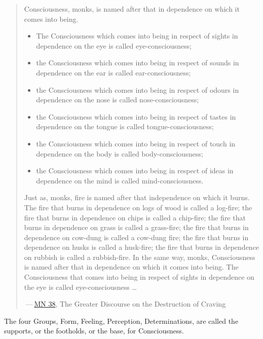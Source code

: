 \begin{quote}
Consciousness, monks, is named after that in dependence on which it comes into being.

\begin{itemize}
\item
  The Consciousness which comes into being in respect of sights in dependence on the eye is called eye-consciousness;
\item
  the Consciousness which comes into being in respect of sounds in dependence on the ear is called ear-consciousness;
\item
  the Consciousness which comes into being in respect of odours in dependence on the nose is called nose-consciousness;
\item
  the Consciousness which comes into being in respect of tastes in dependence on the tongue is called tongue-consciousness;
\item
  the Consciousness which comes into being in respect of touch in dependence on the body is called body-consciousness;
\item
  the Consciousness which comes into being in respect of ideas in dependence on the mind is called mind-consciousness.
\end{itemize}

Just as, monks, fire is named after that independence on which it burns. The fire that burns in dependence on logs of wood is called a log-fire; the fire that burns in dependence on chips is called a chip-fire; the fire that burns in dependence on grass is called a grass-fire; the fire that burns in dependence on cow-dung is called a cow-dung fire; the fire that burns in dependence on husks is called a husk-fire; the fire that burns in dependence on rubbish is called a rubbish-fire. In the same way, monks, Consciousness is named after that in dependence on which it comes into being. The Consciousness that comes into being in respect of sights in dependence on the eye is called eye-consciousness \ldots{}

 --- \href{https://suttacentral.net/mn38/en/bodhi}{MN 38}, The Greater Discourse on the Destruction of Craving
\end{quote}

The four Groups, Form, Feeling, Perception, Determinations, are called the supports, or the footholds, or the base, for Consciousness.

